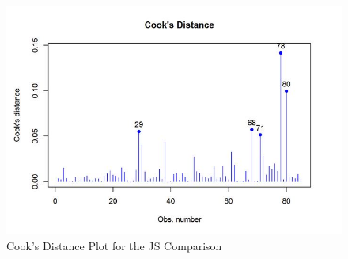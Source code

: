 \documentclass[12pt, a4paper]{report}
\theoremstyle{plain}
\theoremstyle{definition}
\theoremstyle{remark}
\begin{document}
\begin{figure}[h!]
	\centering
	\includegraphics[width=0.99\linewidth]{images/CooksDistancePlot-JS-Roy}
	\caption{Cook's Distance Plot for the JS Comparison}
	\label{fig:CooksDistancePlot-JS-Roy}
\end{figure}	
%	






%
%	
%	
%	


%		
\end{document}
